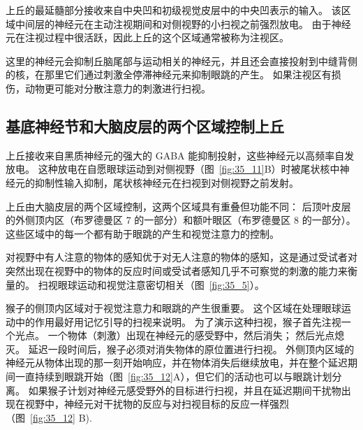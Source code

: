 上丘的最延髓部分接收来自中央凹和初级视觉皮层中的中央凹表示的输入。
该区域中间层的神经元在主动注视期间和对侧视野的小扫视之前强烈放电。
由于神经元在注视过程中很活跃，因此上丘的这个区域通常被称为注视区。


这里的神经元会抑制丘脑尾部与运动相关的神经元，并且还会直接投射到中缝背侧的核，在那里它们通过刺激全停滞神经元来抑制眼跳的产生。
如果注视区有损伤，动物更可能对分散注意力的刺激进行扫视。



\subsection{基底神经节和大脑皮层的两个区域控制上丘}

上丘接收来自黑质神经元的强大的 GABA 能抑制投射，这些神经元以高频率自发放电。
这种放电在自愿眼球运动到对侧视野（图~\ref{fig:35_11}B）时被尾状核中神经元的抑制性输入抑制，尾状核神经元在扫视到对侧视野之前发射。


上丘由大脑皮层的两个区域控制，这两个区域具有重叠但功能不同：
后顶叶皮层的外侧顶内区（布罗德曼区 7 的一部分）和额叶眼区（布罗德曼区 8 的一部分）。 
这些区域中的每一个都有助于眼跳的产生和视觉注意力的控制。


对视野中有人注意的物体的感知优于对无人注意的物体的感知，这是通过受试者对突然出现在视野中的物体的反应时间或受试者感知几乎不可察觉的刺激的能力来衡量的。
扫视眼球运动和视觉注意密切相关（图~\ref{fig:35_5}）。


猴子的侧顶内区域对于视觉注意力和眼跳的产生很重要。
这个区域在处理眼球运动中的作用最好用记忆引导的扫视来说明。
为了演示这种扫视，猴子首先注视一个光点。
一个物体（刺激）出现在神经元的感受野中，然后消失； 然后光点熄灭。
延迟一段时间后，猴子必须对消失物体的原位置进行扫视。
外侧顶内区域的神经元从物体出现的那一刻开始响应，并在物体消失后继续放电，并在整个延迟期间一直持续到眼跳开始（图~\ref{fig:35_12}A），但它们的活动也可以与眼跳计划分离。
如果猴子计划对神经元感受野外的目标进行扫视，并且在延迟期间干扰物出现在视野中，神经元对干扰物的反应与对扫视目标的反应一样强烈（图~\ref{fig:35_12} B).


